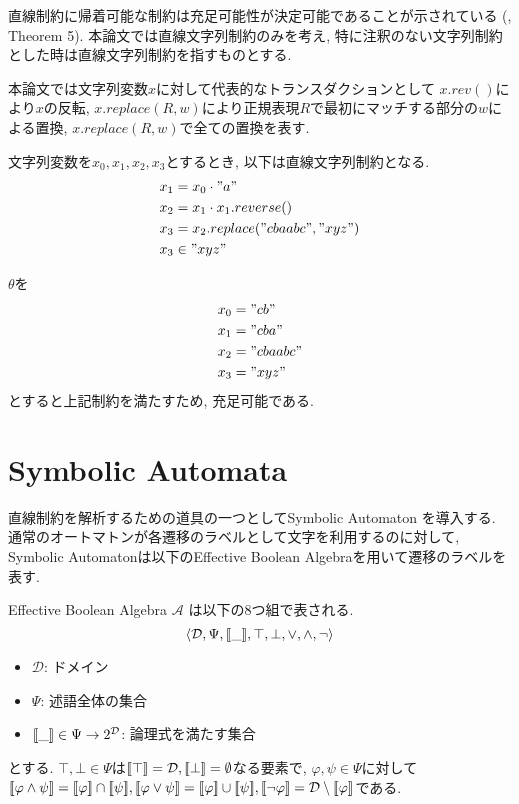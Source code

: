 \documentclass[uplatex,dvipdfmx,a4j]{jsreport}
\begin{document}
  直線制約に帰着可能な制約は充足可能性が決定可能であることが示されている
  (\cite{lin2016string}, Theorem 5).
  本論文では直線文字列制約のみを考え, 特に注釈のない文字列制約とした時は直線文字列制約を指すものとする.

  \begin{example}
    本論文では文字列変数$x$に対して代表的なトランスダクションとして
    $x.rev()$により$x$の反転, $x.replace(R, w)$により正規表現$R$で最初にマッチする部分の$w$による置換,
    $x.replace(R, w)$で全ての置換を表す.

    文字列変数を$x_0, x_1, x_2, x_3$とするとき, 以下は直線文字列制約となる.
    \begin{align*}
      x_1 &= x_0 \cdot "a"  \\
      x_2 &= x_1 \cdot x_1.reverse()  \\
      x_3 &= x_2.replace("cbaabc", "xyz") \\
      x_3 &\in "xyz"
    \end{align*}

    $\theta$を
    \begin{align*}
      x_0 &= "cb" \\
      x_1 &= "cba"  \\
      x_2 &= "cbaabc" \\
      x_3 &= "xyz"
    \end{align*}
    とすると上記制約を満たすため, 充足可能である.
  \end{example}

  \section{Symbolic Automata}

  直線制約を解析するための道具の一つとしてSymbolic Automaton
  \cite{d2017power}を導入する.
  通常のオートマトンが各遷移のラベルとして文字を利用するのに対して,
  Symbolic Automatonは以下のEffective Boolean Algebraを用いて遷移のラベルを表す.

  \begin{definition}
    Effective Boolean Algebra $\mathcal{A}$ は以下の8つ組で表される.
    \[
      {\langle {\mathcal{D}, \Psi,  {[ \! [{\_}] \! ]} , \top, \bot, \lor, \land, \lnot} \rangle}
    \]
    \begin{itemize}
      \item $\mathcal{D}$: ドメイン
      \item $\Psi$: 述語全体の集合
      \item ${[ \! [{\_}] \! ]} \in \Psi \rightarrow 2^{\mathcal{D}}$: 論理式を満たす集合
    \end{itemize}
    とする.
    $\top, \bot \in \Psi$は${[ \! [{\top}] \! ]} = \mathcal{D}, {[ \! [{\bot}] \! ]} = \emptyset$なる要素で,
    $\varphi, \psi \in \Psi$に対して
    $\seman{\varphi \land \psi} = \seman{\varphi} \cap \seman{\psi},
    \seman{\varphi \lor \psi} = \seman{\varphi} \cup \seman{\psi},
    \seman{\lnot \varphi} = \mathcal{D} \setminus \seman{\varphi}$である.
  \end{definition}
\end{document}
